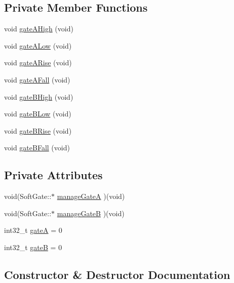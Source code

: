 \subsection*{Private Member Functions}
\begin{DoxyCompactItemize}
\item 
void \mbox{\hyperlink{class_soft_gate_a55629d115ecfafe0e086bb73b4bdcc3b}{gate\+A\+High}} (void)
\item 
void \mbox{\hyperlink{class_soft_gate_a935815934a9def05dc2a35ec83016db7}{gate\+A\+Low}} (void)
\item 
void \mbox{\hyperlink{class_soft_gate_aad2cd02c0999d1f23a38f416f517c317}{gate\+A\+Rise}} (void)
\item 
void \mbox{\hyperlink{class_soft_gate_a4d2ca883c62f79a9fde5de6f23a15aec}{gate\+A\+Fall}} (void)
\item 
void \mbox{\hyperlink{class_soft_gate_af94152dbc0f49a649c0f8a866ddf5b08}{gate\+B\+High}} (void)
\item 
void \mbox{\hyperlink{class_soft_gate_ab17d31eb8c41ad443c7794793f6cbf29}{gate\+B\+Low}} (void)
\item 
void \mbox{\hyperlink{class_soft_gate_aff75d78751f6ff7dbd6f9b29162d8ba8}{gate\+B\+Rise}} (void)
\item 
void \mbox{\hyperlink{class_soft_gate_a43ccf23bf10c01e1a5f18b0cca398fe5}{gate\+B\+Fall}} (void)
\end{DoxyCompactItemize}
\subsection*{Private Attributes}
\begin{DoxyCompactItemize}
\item 
void(Soft\+Gate\+::$\ast$ \mbox{\hyperlink{class_soft_gate_a7a518333fe6b4e8903d6ea7d2dc793c1}{manage\+GateA}} )(void)
\item 
void(Soft\+Gate\+::$\ast$ \mbox{\hyperlink{class_soft_gate_a7f1387c6f76959f2140597dd57feb730}{manage\+GateB}} )(void)
\item 
int32\+\_\+t \mbox{\hyperlink{class_soft_gate_a526b5e54d7d323047db2775bfcbcbcb1}{gateA}} = 0
\item 
int32\+\_\+t \mbox{\hyperlink{class_soft_gate_abf445d85bef521f13070104684ded520}{gateB}} = 0
\end{DoxyCompactItemize}


\subsection{Constructor \& Destructor Documentation}
\mbox{\label{class_soft_gate_a88ebafd53dcc77f9d4dd1226bc3f5ec6}} 
